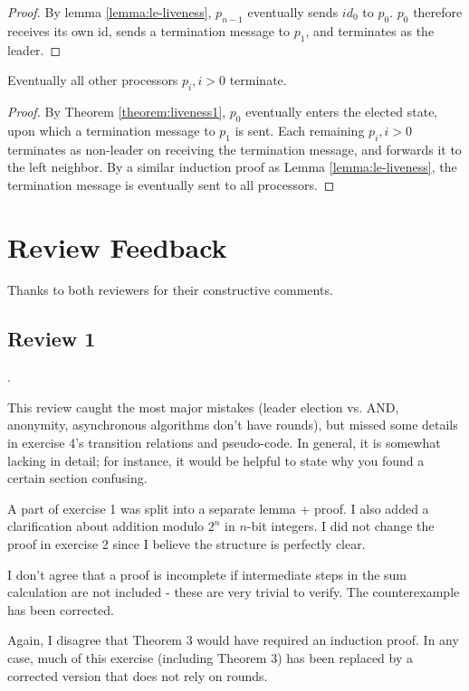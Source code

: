 \begin{proof}
By lemma \ref{lemma:le-liveness}, $p_{n-1}$ eventually sends $id_0$ to $p_0$.
$p_0$ therefore receives its own id, sends a termination message to $p_1$,
and terminates as the leader.
\end{proof}

\begin{theorem}
Eventually all other processors $p_i, i > 0$ terminate.
\end{theorem}

\begin{proof}
By Theorem \ref{theorem:liveness1}, $p_0$ eventually enters the elected state,
upon which a termination message to $p_1$ is sent. Each remaining $p_i, i > 0$ terminates
as non-leader on receiving the termination message, and forwards it to the left neighbor.
By a similar induction proof as Lemma \ref{lemma:le-liveness}, the termination message
is eventually sent to all processors.
\end{proof}

\section{Review Feedback}

Thanks to both reviewers for their constructive comments.

\subsection{Review 1}.

This review caught the most major mistakes (leader election vs. AND, anonymity,
asynchronous algorithms don't have rounds), but missed some details in exercise
4's transition relations and pseudo-code. In general, it is somewhat lacking in detail;
for instance, it would be helpful to state why you found a certain section
confusing.

A part of exercise 1 was split into a separate lemma + proof. I also added a 
clarification about addition modulo $2^n$ in $n$-bit integers. I did not change
the proof in exercise 2 since I believe the structure is perfectly clear.

I don't agree that a proof is incomplete if intermediate steps in the sum
calculation are not included - these are very trivial to verify. The counterexample
has been corrected.

Again, I disagree that Theorem 3 would have required an induction proof. In any case,
much of this exercise (including Theorem 3) has been replaced by a corrected
version that does not rely on rounds.

